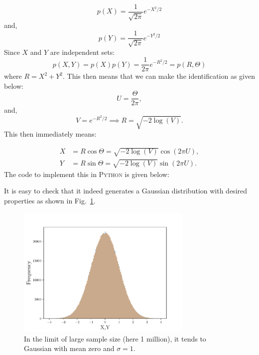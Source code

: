 \documentclass[11pt]{article}
\newcommand{\PY}{\textsc{Python }}
\begin{document}
\begin{equation}
	p(X) = \frac{1}{\sqrt{2\pi}} e^{-X^2/2} 
\end{equation}
and, 
\begin{equation}
	p(Y) = \frac{1}{\sqrt{2\pi}} e^{-Y^2/2} 
\end{equation}
Since $X$ and $Y$ are independent sets:
\begin{equation}
	p(X,Y) = p(X) p(Y) = \frac{1}{2\pi} e^{-R^2/2} = p(R, \Theta) 
\end{equation}
where $R = X^2 + Y^2$. This then means that we can make the identification as given below:
\begin{equation}
	U = \frac{\Theta}{2\pi}, 
\end{equation}
and, 
\begin{equation}
	V = e^{-R^2/2} \implies R = \sqrt{-2 \log(V)}. 
\end{equation}
This then immediately means: 

\begin{align}
	X &= R \cos \Theta = \sqrt{-2 \log(V)} \cos(2 \pi U), \\
	Y &= R \sin \Theta = \sqrt{-2 \log(V)} \sin(2 \pi U).
\end{align}
The code to implement this in \PY is given below: 
\begin{mdframed}[backgroundcolor=mauve!3] 

\end{mdframed} 
It is easy to check that it indeed generates a 
Gaussian distribution with desired properties as shown in Fig.~\ref{fig:RN}. 


\begin{figure}[htbp] 
	\centering 
	\includegraphics[width=0.75\textwidth]{figs/testRN.pdf}
	\caption{\label{fig:RN}In the limit of large sample size (here 1 million), 
		it tends to Gaussian with mean zero and $\sigma=1$.}
\end{figure}
\end{document}
